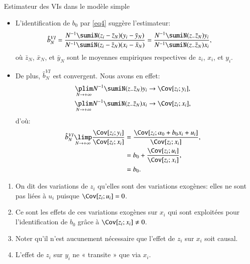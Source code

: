 \begin{frame}[allowframebreaks]{Estimateur des VIs dans le modèle simple}
    \begin{itemize}
        \item L'identification de $b_0$ par \eqref{eq4} suggère l'estimateur:
        \begin{align}
            \hat{b}_N^{VI} &= \frac{N^{-1}\sumiN(z_i - \bar{z}_N)(y_i - \bar{y}_N)}{
                N^{-1}\sumiN(z_i - \bar{z}_N)(x_i - \bar{x}_N)} = 
                \frac{N^{-1}\sumiN (z_-\bar{z}_N)y_i}
                {N^{-1}\sumiN (z_-\bar{z}_N)x_i},
                \label{eq5}
        \end{align}
        où $\bar{z}_N$, $\bar{x}_N$, et  $\bar{y}_N$ sont le moyennes empiriques respectives de 
        $z_i$, $x_i$, et $y_i$. 
        \item De plus, $\hat{b}_N^{VI}$ est convergent. Nous avons en effet:
        \begin{align*}
            \underset{N\to + \infty}{\plim} N^{-1}\sumiN (z_-\bar{z}_N)y_i &\rightarrow 
            \Cov[z_i; y_i],\\
            \underset{N\to + \infty}{\plim} N^{-1}\sumiN (z_-\bar{z}_N)x_i &\rightarrow 
            \Cov[z_i; x_i],
        \end{align*}
        d'où:
        \begin{align*}
            \hat{b}_N^{VI} \underset{N\to + \infty}{\limp} 
            \frac{\Cov[z_i; y_i]}{\Cov[z_i;x_i]} &= \frac{\Cov[z_i; \alpha_0 + b_0x_i + u_i]}{\Cov[z_i;x_i]},\\
            &= b_0 + \frac{\Cov[z_i;u_i]}{\Cov[z_i;x_i]},\\
            &=b_0.
        \end{align*}
    \end{itemize}
    \framebreak
    \begin{remark_fr}
        \begin{enumerate}[$\star$]
            \item On dit des variations de $z_i$ qu’elles sont des variations exogènes: 
            elles ne sont pas liées à $u_i$ puisque $\Cov[z_i;u_i]=0$.
            \item Ce sont les effets de ces variations exogènes sur $x_i$ qui sont exploitées pour 
            l’identification de $b_0$ grâce à $\Cov[z_i;x_i]\neq 0$.
            \item Noter qu’il n’est aucunement nécessaire que l’effet de $z_i$ sur $x_i$ soit causal. 
            \item L’effet de $z_i$ sur $y_i$ ne « transite » que via $x_i$. 

\end{enumerate}
\end{remark_fr}
\end{frame}
